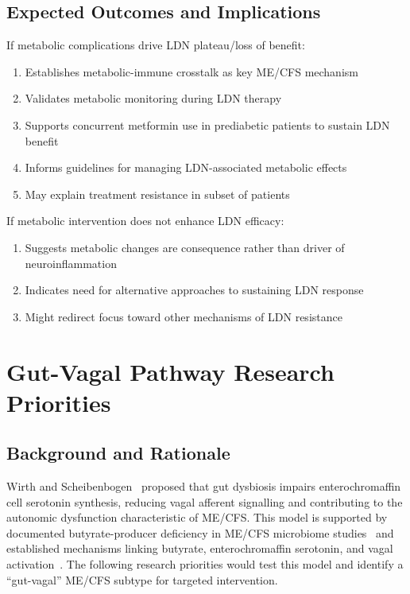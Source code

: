 \subsection{Expected Outcomes and Implications}

If metabolic complications drive LDN plateau/loss of benefit:
\begin{enumerate}
    \item Establishes metabolic-immune crosstalk as key ME/CFS mechanism
    \item Validates metabolic monitoring during LDN therapy
    \item Supports concurrent metformin use in prediabetic patients to sustain LDN benefit
    \item Informs guidelines for managing LDN-associated metabolic effects
    \item May explain treatment resistance in subset of patients
\end{enumerate}

If metabolic intervention does not enhance LDN efficacy:
\begin{enumerate}
    \item Suggests metabolic changes are consequence rather than driver of neuroinflammation
    \item Indicates need for alternative approaches to sustaining LDN response
    \item Might redirect focus toward other mechanisms of LDN resistance
\end{enumerate}

\section{Gut-Vagal Pathway Research Priorities}
\label{sec:gut-vagal-research}

\subsection{Background and Rationale}

Wirth and Scheibenbogen~\cite{WirthScheibenbogen2025Neurotransmitter} proposed that gut dysbiosis impairs enterochromaffin cell serotonin synthesis, reducing vagal afferent signalling and contributing to the autonomic dysfunction characteristic of ME/CFS\@. This model is supported by documented butyrate-producer deficiency in ME/CFS microbiome studies~\cite{ButyrateDeficiency2023, Giloteaux2016} and established mechanisms linking butyrate, enterochromaffin serotonin, and vagal activation~\cite{Barton2025, Kaelberer2018}. The following research priorities would test this model and identify a ``gut-vagal'' ME/CFS subtype for targeted intervention.

